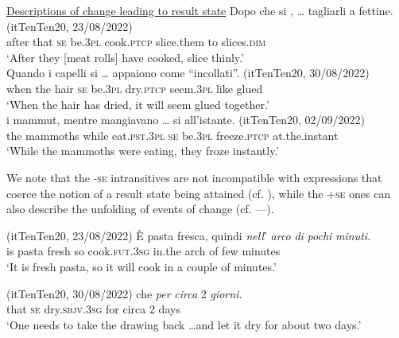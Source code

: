 \documentclass[output=paper,colorlinks,citecolor=brown
]{langscibook}
\begin{document}
\ea \label{bentley_example_25}
    \underline{Descriptions of change leading to result state} 
    \ea  \label{bentley_example_25a}
    \gll Dopo che	si 		 		,  {\ldots}  tagliarli			a fettine. {(itTenTen20, 23/08/2022)} \\
   				after		that	\textsc{se}		be.3\textsc{pl}	cook.\textsc{ptcp}	{} slice.them	to	slices.\textsc{dim} {} \\
    \glt ‘After they [meat rolls] have cooked, slice thinly.’ \\
    \ex \label{bentley_example_25b}
    \gll Quando		i		capelli	si		 		  {\ldots}  appaiono		come “incollati”. {(itTenTen20, 30/08/2022)}\\
    when			the	hair			\textsc{se}		be.3\textsc{pl}	dry.\textsc{ptcp}	{}					seem.3\textsc{pl}		like			glued	{} \\
    \glt 					‘When the hair has dried, it will seem glued together.’ \\
    \ex \label{bentley_example_25c}
    \gll  {\ldots}  i			mammut,		mentre		mangiavano  {\ldots}  si 		 		 		all’istante. {(itTenTen20, 02/09/2022)} \\
    {} 									the	mammoths	while			eat.\textsc{pst}.3\textsc{pl}			{}			\textsc{se}		be.3\textsc{pl}	freeze.\textsc{ptcp}	 at.the.instant	{} \\
    \glt 									‘While the mammoths	 were eating, they froze instantly.’ \\
    \z
\z

We note that the -\textsc{se} intransitives are not incompatible with expressions that coerce the notion of a result state being attained (cf. ), while the +\textsc{se} ones can also describe the unfolding of events of change (cf. —).

\hspace*{\fill}(itTenTen20, 23/08/2022)\quad
\ea \label{bentley_example_26}
    \gll È	pasta	fresca,	quindi  					\textit{nell}’			\textit{arco}		\textit{di}	 	\textit{pochi} \textit{minuti}. \\
    		is	pasta	fresh		so					cook.\textsc{fut}.3\textsc{sg}	in.the		arch		of		few		minutes \\
    \glt ‘It is fresh pasta, so it will cook in a couple of minutes.’
\z

\hspace*{\fill}(itTenTen20, 30/08/2022)\quad
\ea \label{bentley_example_27}
      che									\textit{per}		\textit{circa}	2	\textit{giorni}. \\
    	{} 		that	\textsc{se}		dry.\textsc{sbjv}.3\textsc{sg}		for		circa	2	days \\
    \glt	‘One needs to take the drawing back \ldots  and let it dry for about two days.’
\z
\end{document}
